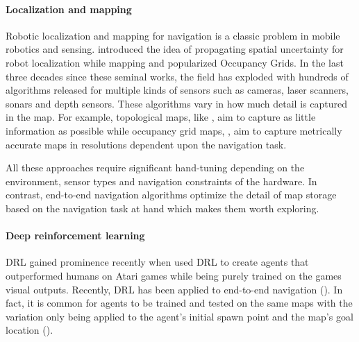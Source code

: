 \paragraph{Localization and mapping}
Robotic localization and mapping for navigation is a classic problem in  mobile robotics and sensing.
\cite{SmChIJRR1986} introduced the idea of propagating spatial uncertainty for robot localization while mapping and \cite{ElCOMPUTER1980} popularized Occupancy Grids.
In the last three decades since these seminal works, the field has exploded with hundreds of algorithms released for multiple kinds of sensors such as cameras, laser scanners, sonars and depth sensors.
These algorithms vary in how much detail is captured in the map. For example, topological maps, like \cite{KuCOGSCI1978}, aim to capture as little information as possible while occupancy grid maps, \cite{ElCOMPUTER1980}, aim to capture metrically accurate maps in resolutions dependent upon the navigation task.

All these approaches require significant hand-tuning depending on the environment, sensor types and navigation constraints of the hardware.
In contrast, end-to-end navigation algorithms optimize the detail of map storage based on the navigation task at hand which makes them worth exploring.

\paragraph{Deep reinforcement learning}
DRL gained prominence recently when \cite{MnKaSiNIPSDLW2013,MnKaSiNATURE2015} used DRL to create agents that outperformed humans on Atari games while being purely trained on the games visual outputs.
Recently, DRL has been applied to end-to-end navigation (\cite{OhChSiICML2016,MiPaViICLR2017,ChLaSaNIPS2016}).
In fact, it is common for agents to be trained and tested on the same maps with the variation only being applied to the agent's initial spawn point and the map's goal location (\cite{MiPaViICLR2017,ZhMoKoICRA2017,KuSaGaAPA2016}). 

